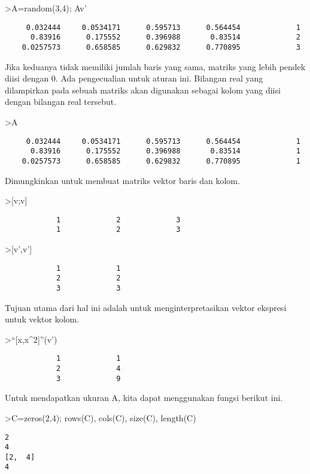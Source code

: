 \documentclass[
]{book}
\begin{document}
\textgreater A=random(3,4); A\textbar v'

\begin{verbatim}
     0.032444     0.0534171      0.595713      0.564454             1 
      0.83916      0.175552      0.396988       0.83514             2 
    0.0257573      0.658585      0.629832      0.770895             3 
\end{verbatim}

Jika keduanya tidak memiliki jumlah baris yang sama, matriks yang lebih pendek diisi dengan 0. Ada pengecualian untuk aturan ini. Bilangan real yang dilampirkan pada sebuah matriks akan digunakan sebagai kolom yang diisi dengan bilangan real tersebut.

\textgreater A

\begin{verbatim}
     0.032444     0.0534171      0.595713      0.564454             1 
      0.83916      0.175552      0.396988       0.83514             1 
    0.0257573      0.658585      0.629832      0.770895             1 
\end{verbatim}

Dimungkinkan untuk membuat matriks vektor baris dan kolom.

\textgreater{[}v;v{]}

\begin{verbatim}
            1             2             3 
            1             2             3 
\end{verbatim}

\textgreater{[}v',v'{]}

\begin{verbatim}
            1             1 
            2             2 
            3             3 
\end{verbatim}

Tujuan utama dari hal ini adalah untuk menginterpretasikan vektor ekspresi untuk vektor kolom.

\textgreater{}``{[}x,x\^{}2{]}''(v')

\begin{verbatim}
            1             1 
            2             4 
            3             9 
\end{verbatim}

Untuk mendapatkan ukuran A, kita dapat menggunakan fungsi berikut ini.

\textgreater C=zeros(2,4); rows(C), cols(C), size(C), length(C)

\begin{verbatim}
2
4
[2,  4]
4
\end{verbatim}
\end{document}
